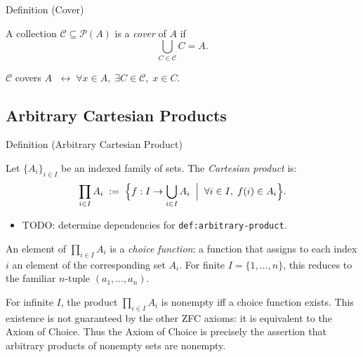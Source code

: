 \begin{definitionbox}{Definition (Cover)}
\begin{definition}[Cover]\label{def:set-cover}
A collection $\mathcal{C} \subseteq \mathcal{P}(A)$ is a \emph{cover} of $A$ if
\[
\bigcup_{C \in \mathcal{C}} C = A.
\]
\end{definition}
\end{definitionbox}

\NoLocalDependencies

\begin{remark*}
$\mathcal{C}$ covers $A$ $\;\leftrightarrow\; \forall x \in A,\; \exists C \in \mathcal{C},\; x \in C$.
\end{remark*}

\begin{exposition}
\vspace{1em}
\end{exposition}
\subsection*{Arbitrary Cartesian Products}

\begin{definitionbox}{Definition (Arbitrary Cartesian Product)}
\begin{definition}\label{def:arbitrary-product}
Let $\{A_i\}_{i \in I}$ be an indexed family of sets. The \emph{Cartesian
product} is:
\[
\prod_{i \in I} A_i
\;:=\;
\Bigl\{
f : I \to \bigcup_{i \in I} A_i
\;\Bigm|\;
\forall i \in I,\; f(i) \in A_i
\Bigr\}.
\]
\end{definition}
\end{definitionbox}

\begin{dependencies}
\begin{itemize}
  \item TODO: determine dependencies for \texttt{def:arbitrary-product}.
\end{itemize}
\end{dependencies}

\begin{remark*}
An element of $\prod_{i \in I} A_i$ is a \emph{choice function}: a function
that assigns to each index $i$ an element of the corresponding set $A_i$.
For finite $I = \{1,\dots,n\}$, this reduces to the familiar $n$-tuple
$(a_1,\dots,a_n)$.
\end{remark*}

\begin{remark*}
For infinite $I$, the product $\prod_{i \in I} A_i$ is nonempty iff a choice
function exists. This existence is not guaranteed by the other ZFC axioms:
it is equivalent to the Axiom of Choice. Thus the Axiom of Choice is
precisely the assertion that arbitrary products of nonempty sets are nonempty.
\end{remark*}
